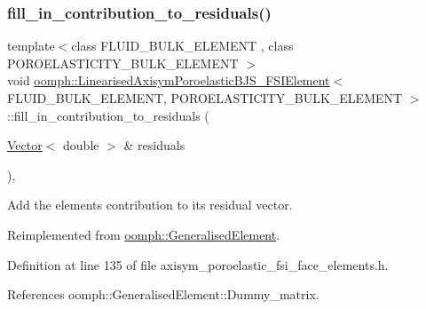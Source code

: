 \subsubsection{\texorpdfstring{fill\+\_\+in\+\_\+contribution\+\_\+to\+\_\+residuals()}{fill\_in\_contribution\_to\_residuals()}}
{\footnotesize\ttfamily template$<$class F\+L\+U\+I\+D\+\_\+\+B\+U\+L\+K\+\_\+\+E\+L\+E\+M\+E\+NT , class P\+O\+R\+O\+E\+L\+A\+S\+T\+I\+C\+I\+T\+Y\+\_\+\+B\+U\+L\+K\+\_\+\+E\+L\+E\+M\+E\+NT $>$ \\
void \hyperlink{classoomph_1_1LinearisedAxisymPoroelasticBJS__FSIElement}{oomph\+::\+Linearised\+Axisym\+Poroelastic\+B\+J\+S\+\_\+\+F\+S\+I\+Element}$<$ F\+L\+U\+I\+D\+\_\+\+B\+U\+L\+K\+\_\+\+E\+L\+E\+M\+E\+NT, P\+O\+R\+O\+E\+L\+A\+S\+T\+I\+C\+I\+T\+Y\+\_\+\+B\+U\+L\+K\+\_\+\+E\+L\+E\+M\+E\+NT $>$\+::fill\+\_\+in\+\_\+contribution\+\_\+to\+\_\+residuals (\begin{DoxyParamCaption}\item[{\hyperlink{classoomph_1_1Vector}{Vector}$<$ double $>$ \&}]{residuals }\end{DoxyParamCaption})\hspace{0.3cm}{\ttfamily [inline]}, {\ttfamily [virtual]}}



Add the element\textquotesingle{}s contribution to its residual vector. 



Reimplemented from \hyperlink{classoomph_1_1GeneralisedElement_a310c97f515e8504a48179c0e72c550d7}{oomph\+::\+Generalised\+Element}.



Definition at line 135 of file axisym\+\_\+poroelastic\+\_\+fsi\+\_\+face\+\_\+elements.\+h.



References oomph\+::\+Generalised\+Element\+::\+Dummy\+\_\+matrix.

\mbox{\label{classoomph_1_1LinearisedAxisymPoroelasticBJS__FSIElement_a68c8de96b9f3034c9437e80036b2df1a}} 
